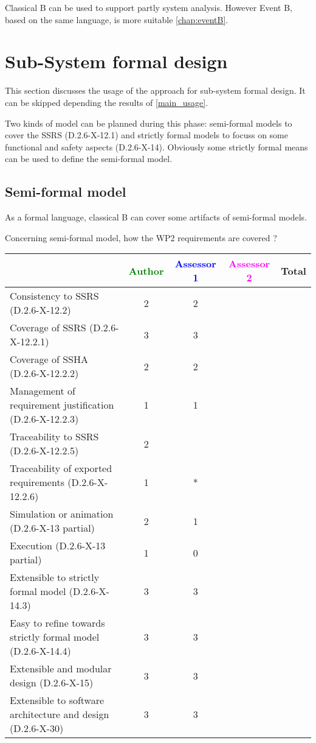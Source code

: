 \begin{author_comment}
Classical B can be used to  support partly  system analysis. However Event B, based on the same language, is more suitable \ref{chap:eventB}.
\end{author_comment}

\section{Sub-System formal design}
This section discusses the usage of the approach for sub-system formal design.
It can be skipped depending the results of \ref{main_usage}.

Two kinds of model can be planned during this phase: semi-formal models to  cover the SSRS (D.2.6-X-12.1) and strictly formal  models to  focuss on some functional and safety aspects (D.2.6-X-14).  Obviously some strictly  formal means can be used to define the semi-formal  model.

\subsection{Semi-formal model}


\begin{author_comment}
As a formal language, classical B  can cover some artifacts of semi-formal models.
\end{author_comment}

Concerning semi-formal model, how the WP2 requirements are covered ?

\begin{tabular}{|l | c | c | c | c|}
\hline
& \textcolor{green}{Author} & \textcolor{blue}{Assessor 1} & \textcolor{magenta}{Assessor 2} & Total \\
\hline 
Consistency to SSRS (D.2.6-X-12.2) & 2 & 2 & &  \\
\hline
Coverage of SSRS (D.2.6-X-12.2.1)  & 3 & 3 & &  \\
\hline
Coverage of SSHA (D.2.6-X-12.2.2)  & 2 & 2 & &  \\
\hline
Management of requirement justification (D.2.6-X-12.2.3)  & 1 & 1 & &  \\
\hline
Traceability to  SSRS (D.2.6-X-12.2.5)  & 2 & & &  \\
\hline
Traceability of exported requirements (D.2.6-X-12.2.6)  & 1 & * & &  \\
\hline
Simulation or animation (D.2.6-X-13 partial)  & 2 & 1 & &  \\
\hline
Execution (D.2.6-X-13 partial)  & 1 & 0 & &  \\
\hline
Extensible to strictly formal model (D.2.6-X-14.3) & 3 & 3 & &  \\
\hline
Easy to  refine towards strictly formal model (D.2.6-X-14.4) & 3 & 3 & &  \\
\hline
Extensible and modular design (D.2.6-X-15)  & 3 & 3 & &  \\
\hline
Extensible to software architecture and design (D.2.6-X-30)   & 3 & 3 & &  \\
\hline
\end{tabular}


